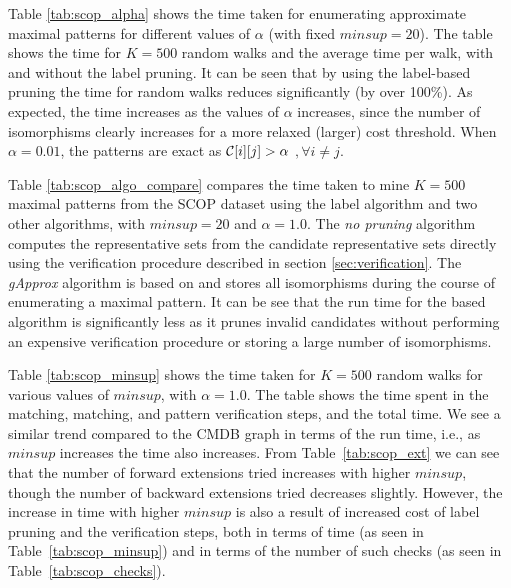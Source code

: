 



\smallskip{} Table \ref{tab:scop_alpha} shows
the time taken for enumerating approximate maximal patterns for
different values of $\alpha$ (with fixed $minsup = 20$). The table shows
the time for $K=500$ random walks and the average time per walk,
with and without the label pruning. It
can be seen that by using the label-based pruning the time for random
walks reduces significantly (by over 100\%).  As expected, the time
increases as the values of $\alpha$ increases, since the number of
isomorphisms clearly increases for a more relaxed (larger) cost
threshold.  When $\alpha = 0.01$, the patterns are exact as
${\mathcal{C}}[i][j] > \alpha$ $,\forall i \neq j$.

Table \ref{tab:scop_algo_compare} compares the time taken to mine $K=500$
maximal patterns from the SCOP dataset using the \ncl label algorithm
and two other algorithms, with $minsup=20$ and $\alpha=1.0$.  The
\textit{no pruning} algorithm computes the representative sets from the
candidate representative sets directly using the verification procedure
described in section \ref{sec:verification}. The \textit{gApprox}
algorithm is based on \cite{gapprox} and stores all isomorphisms during
the course of enumerating a maximal pattern. It can be see
that the run time for the \ncl based algorithm is significantly less
as it prunes invalid
candidates without performing an expensive verification procedure or
storing a large number of isomorphisms.


Table \ref{tab:scop_minsup} shows the time taken for $K=500$ random
walks for various values of $minsup$, with $\alpha = 1.0$. The table
shows the time spent in the \khop matching, \ncl matching, and pattern
verification steps, and the total time. 
We see a similar trend compared
to the CMDB graph in terms of the run time, i.e., as $minsup$ increases
the time also increases. From Table~\ref{tab:scop_ext} we can see that
the number of forward extensions tried increases with higher $minsup$, though
the number of backward extensions tried decreases slightly. However, the
increase in time with higher $minsup$ is also a result of increased cost
of \ncl label pruning and the verification steps, both in terms of time
(as seen in Table~\ref{tab:scop_minsup}) and in terms of the number of
such checks (as seen in Table~\ref{tab:scop_checks}). 
%

